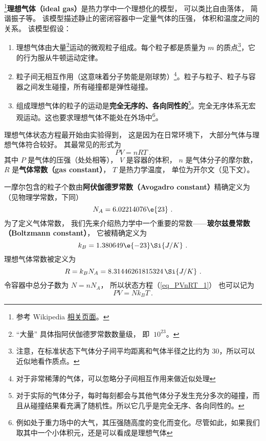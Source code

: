 

\footnote{参考 Wikipedia \href{https://en.wikipedia.org/wiki/Ideal_gas}{相关页面}。}\textbf{理想气体（ideal gas）}是热力学中一个理想化的模型， 可以类比自由落体， 简谐振子等。 该模型描述静止的密闭容器中一定量气体的压强， 体积和温度之间的关系。 该模型假设：
\begin{enumerate}
\item 理想气体由大量\footnote{“大量” 具体指阿伏伽德罗常数数量级， 即 $~10^{23}$。}运动的微观粒子组成。每个粒子都是质量为 $m$ 的质点\footnote{注意，在标准状态下气体分子间平均距离和气体半径之比约为 $30$，所以可以近似地看作质点。}，它的行为服从牛顿运动定律。

\item 粒子间无相互作用（这意味着分子势能是刚球势）\footnote{对于非常稀薄的气体，可以忽略分子间相互作用来做近似处理}。粒子与粒子、粒子与容器之间发生碰撞，所有碰撞都是弹性碰撞。

\item 组成理想气体的粒子的运动是\textbf{完全无序的、各向同性的}\footnote{对于实际的气体分子，每时每刻都会与其他气体分子发生充分多次的碰撞，而且从碰撞结果看充满了随机性。所以它几乎是完全无序、各向同性的。}。完全无序体系无宏观运动。这也要求理想气体不能处在外场中\footnote{例如处于重力场中的大气，其压强随高度的变化而变化。尽管如此，如果我们取其中一个小体积元，还是可以看成是理想气体}。
\end{enumerate}

理想气体状态方程最开始由实验得到， 这是因为在日常环境下， 大部分气体与理想气体符合较好。 其最常见的形式为
\begin{equation}\label{eq_PVnRT_1}
PV = nRT~.
\end{equation}
其中 $P$ 是气体的压强（处处相等）， $V$ 是容器的体积， $n$ 是气体分子的摩尔数， $R$ 是\textbf{气体常数（gas constant）}， $T$ 是热力学温度， 单位为开尔文（见下文）。

一摩尔包含的粒子个数由\textbf{阿伏伽德罗常数（Avogadro constant）}精确定义为（见物理学常数，下同）
\begin{equation}
N_A = 6.02214076\e{23}~.
\end{equation}
为了定义气体常数， 我们先来介绍热力学中一个重要的常数——\textbf{玻尔兹曼常数（Boltzmann constant）}， 它被精确定义为
\begin{equation}
k_B = 1.380649\e{-23} \Si{J/K}~.
\end{equation}
理想气体常数被定义为
\begin{equation}\label{eq_PVnRT_2}
R = k_B N_A = 8.31446261815324 \,\Si{J/K}~.
\end{equation}
令容器中总分子数为 $N = n N_A$， 所以状态方程（\autoref{eq_PVnRT_1}） 也可以记为
\begin{equation}\label{eq_PVnRT_4}
PV = N k_B T~.
\end{equation}

